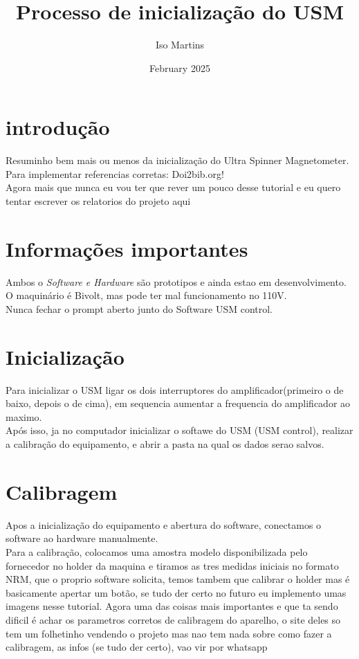 \documentclass{paper}[geophysics]
\title{Processo de inicialização do USM}
\author{ Iso Martins }
\date{February 2025}
\begin{document}
\maketitle

\section{introdução}
  Resuminho bem mais ou menos da inicialização do Ultra Spinner Magnetometer.\\
  Para implementar referencias corretas: Doi2bib.org!\\
  Agora mais que nunca eu vou ter que rever um pouco desse tutorial e eu quero tentar escrever os relatorios do projeto aqui
	
\section{Informações importantes}
Ambos o \emph{Software e Hardware} são prototipos e ainda estao em desenvolvimento.\\
O maquinário é Bivolt, mas pode ter mal funcionamento no 110V.\\
Nunca fechar o prompt aberto junto do Software USM control.\\

\section{Inicialização}
Para inicializar o USM ligar os dois interruptores do amplificador(primeiro o de baixo, depois o de cima), em sequencia aumentar a frequencia do amplificador ao maximo.\\
Após isso, ja no computador inicializar o softawe do USM (USM control), realizar a calibração do equipamento, e abrir a pasta na qual os dados serao salvos.

\section{Calibragem}
Apos a inicialização do equipamento e abertura do software, conectamos o software ao hardware manualmente.\\
Para a calibração, colocamos uma amostra modelo disponibilizada pelo fornecedor no holder da maquina e tiramos as tres medidas iniciais no formato NRM, que o proprio software solicita, temos tambem que calibrar o holder mas é basicamente apertar um botão, se tudo der certo no futuro eu implemento umas imagens nesse tutorial. Agora uma das coisas mais importantes e que ta sendo dificil é achar os parametros corretos de calibragem do aparelho, o site deles so tem um folhetinho vendendo o projeto mas nao tem nada sobre como fazer a calibragem, as infos (se tudo der certo), vao vir por whatsapp
\end{document}
